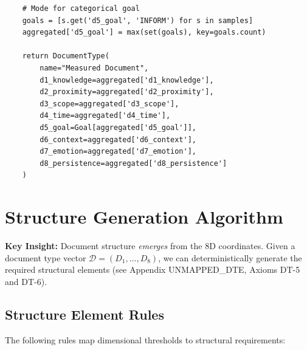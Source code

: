 \begin{verbatim}
    # Mode for categorical goal
    goals = [s.get('d5_goal', 'INFORM') for s in samples]
    aggregated['d5_goal'] = max(set(goals), key=goals.count)

    return DocumentType(
        name="Measured Document",
        d1_knowledge=aggregated['d1_knowledge'],
        d2_proximity=aggregated['d2_proximity'],
        d3_scope=aggregated['d3_scope'],
        d4_time=aggregated['d4_time'],
        d5_goal=Goal[aggregated['d5_goal']],
        d6_context=aggregated['d6_context'],
        d7_emotion=aggregated['d7_emotion'],
        d8_persistence=aggregated['d8_persistence']
    )
\end{verbatim}


\section{Structure Generation Algorithm}
\label{sec:doctype-structure}

\textbf{Key Insight:} Document structure \textit{emerges} from the 8D coordinates.
Given a document type vector $\mathcal{D} = (D_1, ..., D_8)$, we can deterministically
generate the required structural elements (see Appendix UNMAPPED_DTE, Axioms DT-5 and DT-6).

\subsection{Structure Element Rules}

The following rules map dimensional thresholds to structural requirements:


